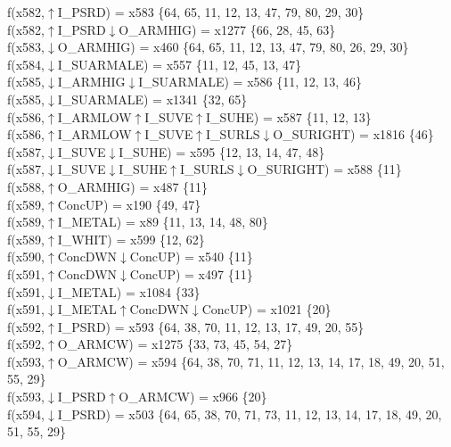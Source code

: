 f(x582,$\uparrow$I\_PSRD) = x583 \{64, 65, 11, 12, 13, 47, 79, 80, 29, 30\} \\  
f(x582,$\uparrow$I\_PSRD$\downarrow$O\_ARMHIG) = x1277 \{66, 28, 45, 63\} \\  
f(x583,$\downarrow$O\_ARMHIG) = x460 \{64, 65, 11, 12, 13, 47, 79, 80, 26, 29, 30\} \\  
f(x584,$\downarrow$I\_SUARMALE) = x557 \{11, 12, 45, 13, 47\} \\  
f(x585,$\downarrow$I\_ARMHIG$\downarrow$I\_SUARMALE) = x586 \{11, 12, 13, 46\} \\  
f(x585,$\downarrow$I\_SUARMALE) = x1341 \{32, 65\} \\  
f(x586,$\uparrow$I\_ARMLOW$\uparrow$I\_SUVE$\uparrow$I\_SUHE) = x587 \{11, 12, 13\} \\  
f(x586,$\uparrow$I\_ARMLOW$\uparrow$I\_SUVE$\uparrow$I\_SURLS$\downarrow$O\_SURIGHT) = x1816 \{46\} \\  
f(x587,$\downarrow$I\_SUVE$\downarrow$I\_SUHE) = x595 \{12, 13, 14, 47, 48\} \\  
f(x587,$\downarrow$I\_SUVE$\downarrow$I\_SUHE$\uparrow$I\_SURLS$\downarrow$O\_SURIGHT) = x588 \{11\} \\  
f(x588,$\uparrow$O\_ARMHIG) = x487 \{11\} \\  
f(x589,$\uparrow$ConcUP) = x190 \{49, 47\} \\  
f(x589,$\uparrow$I\_METAL) = x89 \{11, 13, 14, 48, 80\} \\  
f(x589,$\uparrow$I\_WHIT) = x599 \{12, 62\} \\  
f(x590,$\uparrow$ConcDWN$\downarrow$ConcUP) = x540 \{11\} \\  
f(x591,$\uparrow$ConcDWN$\downarrow$ConcUP) = x497 \{11\} \\  
f(x591,$\downarrow$I\_METAL) = x1084 \{33\} \\  
f(x591,$\downarrow$I\_METAL$\uparrow$ConcDWN$\downarrow$ConcUP) = x1021 \{20\} \\  
f(x592,$\uparrow$I\_PSRD) = x593 \{64, 38, 70, 11, 12, 13, 17, 49, 20, 55\} \\  
f(x592,$\uparrow$O\_ARMCW) = x1275 \{33, 73, 45, 54, 27\} \\  
f(x593,$\uparrow$O\_ARMCW) = x594 \{64, 38, 70, 71, 11, 12, 13, 14, 17, 18, 49, 20, 51, 55, 29\} \\  
f(x593,$\downarrow$I\_PSRD$\uparrow$O\_ARMCW) = x966 \{20\} \\  
f(x594,$\downarrow$I\_PSRD) = x503 \{64, 65, 38, 70, 71, 73, 11, 12, 13, 14, 17, 18, 49, 20, 51, 55, 29\} \\  
